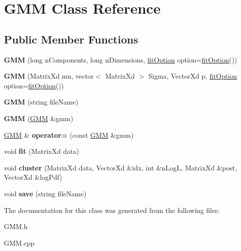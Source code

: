 \hypertarget{class_g_m_m}{\section{G\+M\+M Class Reference}
\label{class_g_m_m}
}
\subsection*{Public Member Functions}
\begin{DoxyCompactItemize}
\item 
\hypertarget{class_g_m_m_a780eb798b963d64324e60f8a05511793}{{\bfseries G\+M\+M} (long n\+Components, long n\+Dimensions, \hyperlink{structfit_option}{fit\+Option} option=\hyperlink{structfit_option}{fit\+Option}())}\label{class_g_m_m_a780eb798b963d64324e60f8a05511793}

\item 
\hypertarget{class_g_m_m_a204c0939ce8e0544a70f6bacac70430e}{{\bfseries G\+M\+M} (Matrix\+Xd mu, vector$<$ Matrix\+Xd $>$ Sigma, Vector\+Xd p, \hyperlink{structfit_option}{fit\+Option} option=\hyperlink{structfit_option}{fit\+Option}())}\label{class_g_m_m_a204c0939ce8e0544a70f6bacac70430e}

\item 
\hypertarget{class_g_m_m_a3fd2ad1e4b02532fbcc8c268f60b4ee8}{{\bfseries G\+M\+M} (string file\+Name)}\label{class_g_m_m_a3fd2ad1e4b02532fbcc8c268f60b4ee8}

\item 
\hypertarget{class_g_m_m_ae4a3fdfee01a1f37a58d405b701f1469}{{\bfseries G\+M\+M} (\hyperlink{class_g_m_m}{G\+M\+M} \&gmm)}\label{class_g_m_m_ae4a3fdfee01a1f37a58d405b701f1469}

\item 
\hypertarget{class_g_m_m_a60cc7218be23fa401a804b5d419632b9}{\hyperlink{class_g_m_m}{G\+M\+M} \& {\bfseries operator=} (const \hyperlink{class_g_m_m}{G\+M\+M} \&gmm)}\label{class_g_m_m_a60cc7218be23fa401a804b5d419632b9}

\item 
\hypertarget{class_g_m_m_a8da11088f8e7371786a80d64fc21e378}{void {\bfseries fit} (Matrix\+Xd data)}\label{class_g_m_m_a8da11088f8e7371786a80d64fc21e378}

\item 
\hypertarget{class_g_m_m_a520a9559626e08e3cb4e9863262da300}{void {\bfseries cluster} (Matrix\+Xd data, Vector\+Xd \&idx, int \&n\+Log\+L, Matrix\+Xd \&post, Vector\+Xd \&log\+Pdf)}\label{class_g_m_m_a520a9559626e08e3cb4e9863262da300}

\item 
\hypertarget{class_g_m_m_af57b5c21205ecd53619f67117555388e}{void {\bfseries save} (string file\+Name)}\label{class_g_m_m_af57b5c21205ecd53619f67117555388e}

\end{DoxyCompactItemize}


The documentation for this class was generated from the following files\+:\begin{DoxyCompactItemize}
\item 
G\+M\+M.\+h\item 
G\+M\+M.\+cpp\end{DoxyCompactItemize}
